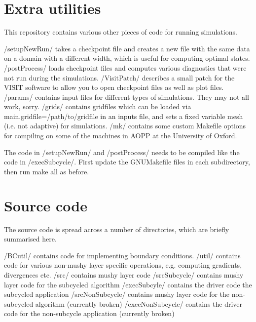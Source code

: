 \section*{Extra utilities}

This repository contains various other pieces of code for running simulations.

{\ttfamily /setup\+New\+Run/} takes a checkpoint file and creates a new file with the same data on a domain with a different width, which is useful for computing optimal states. {\ttfamily /post\+Process/} loads checkpoint files and computes various diagnostics that were not run during the simulations. {\ttfamily /\+Visit\+Patch/} describes a small patch for the V\+I\+S\+IT software to allow you to open checkpoint files as well as plot files. {\ttfamily /params/} contains input files for different types of simulations. They may not all work, sorry. {\ttfamily /grids/} contains gridfiles which can be loaded via {\ttfamily main.\+gridfile=/path/to/gridfile} in an inputs file, and sets a fixed variable mesh (i.\+e. not adaptive) for simulations. {\ttfamily /mk/} contains some custom Makefile options for compiling on some of the machines in A\+O\+PP at the University of Oxford.

The code in {\ttfamily /setup\+New\+Run/} and {\ttfamily /post\+Process/} needs to be compiled like the code in {\ttfamily /exec\+Subcycle/}. First update the {\ttfamily G\+N\+U\+Makefile} files in each subdirectory, then run {\ttfamily make all} as before.

\section*{Source code}

The source code is spread across a number of directories, which are briefly summarised here.

{\ttfamily /\+B\+Cutil/} contains code for implementing boundary conditions. {\ttfamily /util/} contains code for various non-\/mushy layer specific operations, e.\+g. computing gradients, divergences etc. {\ttfamily /src/} contains mushy layer code {\ttfamily /src\+Subcycle/} contains mushy layer code for the subcycled algorithm {\ttfamily /exec\+Subcyle/} contains the driver code the subcycled application {\ttfamily /src\+Non\+Subcycle/} contains mushy layer code for the non-\/subcycled algorithm (currently broken) {\ttfamily /exec\+Non\+Subcycle/} contains the driver code for the non-\/subcycle application (currently broken)

